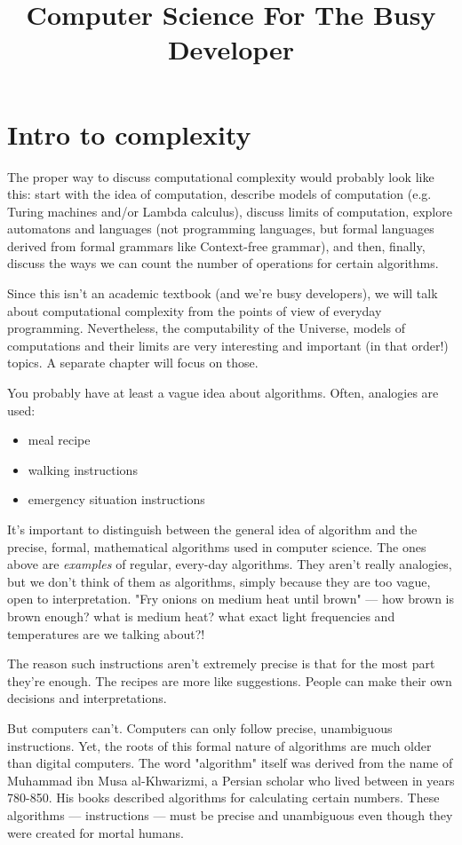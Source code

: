 \documentclass[a4paper, justified, notitlepage, sfsidenotes, notoc]{tufte-book}
\date{}
\title{Computer Science For The Busy Developer}
\begin{document}
\part{Intro to complexity}
\label{sec:org40a2477}

The proper way to discuss computational complexity would probably look like this: start with the idea of computation, describe models of computation (e.g. Turing machines and/or Lambda calculus), discuss limits of computation, explore automatons and languages (not programming languages, but formal languages derived from formal grammars like Context-free grammar), and then, finally, discuss the ways we can count the number of operations for certain algorithms.

Since this isn't an academic textbook (and we're busy developers), we will talk about computational complexity from the points of view of everyday programming. Nevertheless, the computability of the Universe, models of computations and their limits are very interesting and important (in that order!) topics. A separate chapter will focus on those.

You probably have at least a vague idea about algorithms. Often, analogies are used:

\begin{itemize}
\item meal recipe
\item walking instructions
\item emergency situation instructions
\end{itemize}

It's important to distinguish between the general idea of algorithm and the precise, formal, mathematical algorithms used in computer science. The ones above are \emph{examples} of regular, every-day algorithms. They aren't really analogies, but we don't think of them as algorithms, simply because they are too vague, open to interpretation. "Fry onions on medium heat until brown" — how brown is brown enough? what is medium heat? what exact light frequencies and temperatures are we talking about?!

The reason such instructions aren't extremely precise is that for the most part they're enough. The recipes are more like suggestions. People can make their own decisions and interpretations.

But computers can't. Computers can only follow precise, unambiguous instructions. Yet, the roots of this formal nature of algorithms are much older than digital computers. The word "algorithm" itself was derived from the name of Muhammad ibn Musa al-Khwarizmi, a Persian scholar who lived between in years 780-850. His books described algorithms for calculating certain numbers. These algorithms — instructions — must be precise and unambiguous even though they were created for mortal humans.
\end{document}
